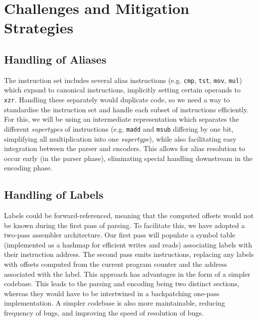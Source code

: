 \documentclass[9.5pt]{article}
\begin{document}
\section{Challenges and Mitigation Strategies}
\subsection{Handling of Aliases}
The instruction set includes several alias instructions (e.g.  \texttt{cmp}, \texttt{tst}, \texttt{mov}, \texttt{mul}) which expand to canonical instructions, implicitly setting certain operands to \texttt{xzr}. Handling these separately would duplicate code, so we need a way to standardise the instruction set and handle each subset of instructions efficiently. For this, we will be using an intermediate representation which separates the different \textit{supertypes} of instructions (e.g. \texttt{madd} and \texttt{msub} differing by one bit, simplifying all multiplication into one \textit{supertype}), while also facilitating easy integration between the parser and encoders. This allows for alias resolution to occur early (in the parser phase), eliminating special handling downstream in the encoding phase. 

\subsection{Handling of Labels}
Labels could be forward-referenced, meaning that the computed offsets would not be known during the first pass of parsing. To facilitate this, we have adopted a two-pass assembler architecture. Our first pass will populate a symbol table (implemented as a hashmap for efficient writes and reads) associating labels with their instruction address. The second pass emits instructions, replacing any labels with offsets computed from the current program counter and the address associated with the label. This approach has advantages in the form of a simpler codebase. This leads to the parsing and encoding being two distinct sections, whereas they would have to be intertwined in a backpatching one-pass implementation. A simpler codebase is also more maintainable, reducing frequency of bugs, and improving the speed of resolution of bugs.
\end{document}
